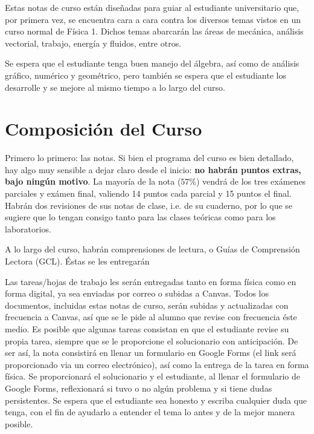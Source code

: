 %
Estas notas de curso est\'an dise\~nadas para guiar al estudiante universitario que, por primera vez, se encuentra cara a cara contra los diversos temas vistos en un curso normal de F\'isica 1. Dichos temas abarcar\'an las \'areas de mec\'anica, an\'alisis vectorial, trabajo, energ\'ia y fluidos, entre otros. 

Se espera que el estudiante tenga buen manejo del \'algebra, as\'i como de an\'alisis gr\'afico, num\'erico y geom\'etrico, pero tambi\'en se espera que el estudiante los desarrolle y se mejore al mismo tiempo a lo largo del curso.

\section{Composici\'on del Curso}

Primero lo primero: las notas. Si bien el programa del curso es bien detallado, hay algo muy sensible a dejar claro desde el inicio: \textbf{no habr\'an puntos extras, bajo ning\'un motivo}. La mayor\'ia de la nota ($57\%$) vendr\'a de los tres ex\'amenes parciales y ex\'amen final, valiendo 14 puntos cada parcial y 15 puntos el final. Habr\'an dos revisiones de sus notas de clase, i.e. de su cuaderno, por lo que se sugiere que lo tengan consigo tanto para las clases te\'oricas como para los laboratorios.

A lo largo del curso, habr\'an comprensiones de lectura, o Gu\'ias de Comprensi\'on Lectora (GCL). \'Estas se les entregar\'an

Las tareas/hojas de trabajo les ser\'an entregadas tanto en forma f\'isica como en forma digital, ya sea enviadas por correo o subidas a Canvas. Todos los documentos, incluidas estas notas de curso, ser\'an subidas y actualizadas con frecuencia a Canvas, as\'i que se le pide al alumno que revise con frecuencia \'este medio. Es posible que algunas tareas consistan en que el estudiante revise su propia tarea, siempre que se le proporcione el solucionario con anticipaci\'on. De ser as\'i, la nota consistir\'a en llenar un formulario en Google Forms (el link ser\'a proporcionado via un correo electr\'onico), as\'i como la entrega de la tarea en forma f\'isica. Se proporcionar\'a el solucionario y el estudiante, al llenar el formulario de Google Forms, reflexionar\'a si tuvo o no alg\'un problema y si tiene dudas persistentes. Se espera que el estudiante sea honesto y escriba cualquier duda que tenga, con el fin de ayudarlo a entender el tema lo antes y de la mejor manera posible.

